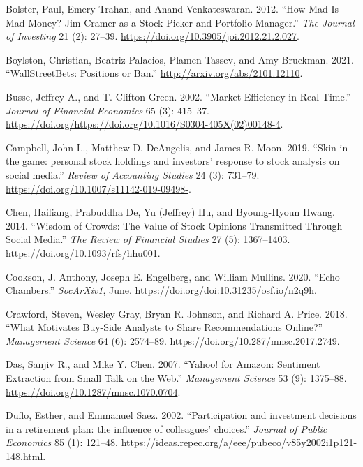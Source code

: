 \documentclass[12pt,]{article}
\begin{document}
\leavevmode\hypertarget{ref-bolster2012}{}%
Bolster, Paul, Emery Trahan, and Anand Venkateswaran. 2012. ``How Mad Is
Mad Money? Jim Cramer as a Stock Picker and Portfolio Manager.''
\emph{The Journal of Investing} 21 (2): 27--39.
\url{https://doi.org/10.3905/joi.2012.21.2.027}.

\leavevmode\hypertarget{ref-boylston2021}{}%
Boylston, Christian, Beatriz Palacios, Plamen Tassev, and Amy Bruckman.
2021. ``WallStreetBets: Positions or Ban.''
\url{http://arxiv.org/abs/2101.12110}.

\leavevmode\hypertarget{ref-busse2002}{}%
Busse, Jeffrey A., and T. Clifton Green. 2002. ``Market Efficiency in
Real Time.'' \emph{Journal of Financial Economics} 65 (3): 415--37.
\url{https://doi.org/https://doi.org/10.1016/S0304-405X(02)00148-4}.

\leavevmode\hypertarget{ref-campbell2019}{}%
Campbell, John L., Matthew D. DeAngelis, and James R. Moon. 2019. ``Skin
in the game: personal stock holdings and investors' response to stock
analysis on social media.'' \emph{Review of Accounting Studies} 24 (3):
731--79. \url{https://doi.org/10.1007/s11142-019-09498-}.

\leavevmode\hypertarget{ref-chen2014}{}%
Chen, Hailiang, Prabuddha De, Yu (Jeffrey) Hu, and Byoung-Hyoun Hwang.
2014. ``Wisdom of Crowds: The Value of Stock Opinions Transmitted
Through Social Media.'' \emph{The Review of Financial Studies} 27 (5):
1367--1403. \url{https://doi.org/10.1093/rfs/hhu001}.

\leavevmode\hypertarget{ref-cookson2020}{}%
Cookson, J. Anthony, Joseph E. Engelberg, and William Mullins. 2020.
``Echo Chambers.'' \emph{SocArXiv1}, June.
\url{https://doi.org/doi:10.31235/osf.io/n2q9h}.

\leavevmode\hypertarget{ref-crawford2018}{}%
Crawford, Steven, Wesley Gray, Bryan R. Johnson, and Richard A. Price.
2018. ``What Motivates Buy-Side Analysts to Share Recommendations
Online?'' \emph{Management Science} 64 (6): 2574--89.
\url{https://doi.org/10.287/mnsc.2017.2749}.

\leavevmode\hypertarget{ref-das2007}{}%
Das, Sanjiv R., and Mike Y. Chen. 2007. ``Yahoo! for Amazon: Sentiment
Extraction from Small Talk on the Web.'' \emph{Management Science} 53
(9): 1375--88. \url{https://doi.org/10.1287/mnsc.1070.0704}.

\leavevmode\hypertarget{ref-duflo2002}{}%
Duflo, Esther, and Emmanuel Saez. 2002. ``Participation and investment
decisions in a retirement plan: the influence of colleagues' choices.''
\emph{Journal of Public Economics} 85 (1): 121--48.
\url{https://ideas.repec.org/a/eee/pubeco/v85y2002i1p121-148.html}.
\end{document}
